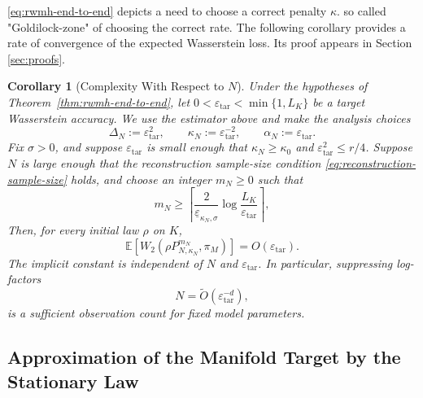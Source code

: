 \documentclass{article}
\newtheorem{corollary}{Corollary}
\newcommand{\E}{\mathbb E}
\numberwithin{equation}{section}
\newcommand{\eps}{\varepsilon}
\renewcommand{\epsilon}{\eps}
\begin{document}
\eqref{eq:rwmh-end-to-end} depicts a need to choose a correct penalty $\kappa$.  so called "Goldilock-zone" of choosing the correct rate. The following corollary provides a rate of convergence of the expected Wasserstein loss. Its proof appears in Section \ref{sec:proofs}.
\begin{corollary}[Complexity With Respect to $N$]
\label{cor:rwmh-expected-rate}
Under the hypotheses of Theorem~\ref{thm:rwmh-end-to-end}, let
$0<\epsilon_{\mathrm{tar}}<\min\{1,L_K\}$ be a target Wasserstein accuracy. We use the estimator above and make the analysis choices
\[
 \Delta_N:=\epsilon_{\mathrm{tar}}^2,
 \qquad
 \kappa_N:=\epsilon_{\mathrm{tar}}^{-2},
 \qquad
 \alpha_N:=\epsilon_{\mathrm{tar}}.
\]
Fix $\sigma>0$, and suppose $\epsilon_{\mathrm{tar}}$ is small enough that
$\kappa_N\ge\kappa_0$ and
$\epsilon_{\mathrm{tar}}^2\le r/4$. Suppose $N$ is large enough that the
reconstruction sample-size condition \eqref{eq:reconstruction-sample-size}
holds,
and choose an integer $m_N\ge0$ such that
\begin{equation}
 m_N
 \ge
 \left\lceil
 \frac{2}{\underline\varepsilon_{\kappa_N,\sigma}}
 \log\frac{L_K}{\epsilon_{\mathrm{tar}}}
\right\rceil,
\label{eq:rwmh-optimized-iterations}
\end{equation}
Then, for every initial law $\rho$ on $K$,
\begin{equation}
 \E\left[
 W_2(\rho P_{N,\kappa_N}^{m_N},\pi_M)
 \right]
 =O(\epsilon_{\mathrm{tar}}).
\label{eq:rwmh-expected-rate}
\end{equation}
The implicit constant is independent of $N$ and
$\epsilon_{\mathrm{tar}}$. In particular, suppressing log-factors
\[
 N=\widetilde O\left(
 \epsilon_{\mathrm{tar}}^{-d}
 \right),
\]
is a sufficient observation count for fixed model parameters.
\end{corollary}



\subsection{Approximation of the Manifold Target by the Stationary Law}
\label{sec:stationary-approximation}
\end{document}

